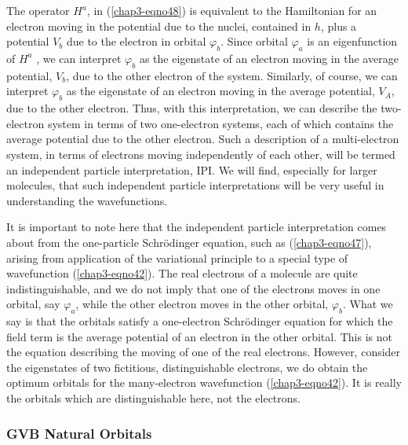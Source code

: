 The operator $H^a$, in (\ref{chap3-eqno48}) is equivalent to the
Hamiltonian for an electron moving in the potential due to the nuclei,
contained in $h$, plus a potential $V_b$ due to the electron in
orbital $\varphi_b$.  Since orbital $\varphi_a$ is an eigenfunction of
$H^a$ , we can interpret $\varphi_b$ as the eigenstate of an electron
moving in the average potential, $V_b$, due to the other electron of
the system.  Similarly, of course, we can interpret $\varphi_b$ as the
eigenstate of an electron moving in the average potential, $V_A$, due
to the other electron.  Thus, with this interpretation, we can
describe the two-electron system in terms of two one-electron systems,
each of which contains the average potential due to the other
electron.  Such a description of a multi-electron system, in terms of
electrons moving independently of each other, will be termed an
independent particle interpretation, IPI.  We will find, especially
for larger molecules, that such independent particle interpretations
will be very useful in understanding the wavefunctions.

It is important to note here that the independent particle
interpretation comes about from the one-particle Schr\"odinger
equation, such as (\ref{chap3-eqno47}), arising from application of the
variational principle to a special type of wavefunction
(\ref{chap3-eqno42}).  The real electrons of a molecule are quite
indistinguishable, and we do not imply that one of the electrons moves
in one orbital, say $\varphi_a$, while the other electron moves in the
other orbital, $\varphi_b$.  What we say is that the orbitals satisfy
a one-electron Schr\"odinger equation for which the field term is the
average potential of an electron in the other orbital.  This is not
the equation describing the moving of one of the real electrons.
However, consider the eigenstates of two fictitious, distinguishable
electrons, we do obtain the optimum orbitals for the many-electron
wavefunction (\ref{chap3-eqno42}).  It is really the orbitals which are
distinguishable here, not the electrons.

\subsubsection{GVB Natural Orbitals}

